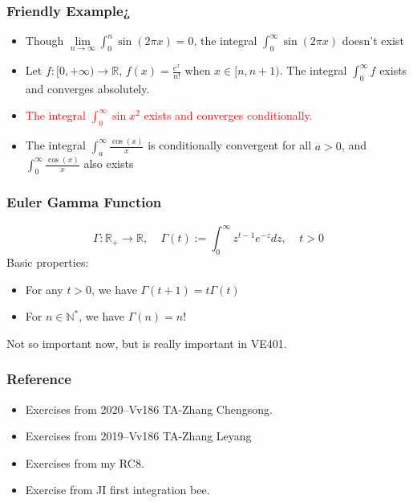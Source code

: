 \documentclass{beamer}
\newcommand{\R}{\mathbb{R}}
\newcommand{\vs}{\vspace{1em}}
\begin{document}
\begin{frame}
    \frametitle{Friendly Example¿}
    \begin{itemize}
        \item Though $\underset{n \to \infty}{\lim} \int_0^n \sin(2\pi x) =0$, the integral $\int_0^\infty \sin (2\pi x) $ doesn't exist 
        \item Let $f:[0, +\infty)\to \R$, $f(x)=\frac{e^x}{n!}$ when $x \in [n,n+1)$. The integral $\int_0^\infty f$ exists and converges absolutely. 
        \item \textcolor{red}{The integral $\int_0^\infty \sin x^2 $  exists and converges conditionally.} 
        \item The integral $\int_a^\infty \frac{\cos(x)}{x}$ is conditionally convergent for all $a>0$, and $\int_0^\infty  \frac{\cos(x)}{x}$ also exists 
        
    \end{itemize}
    

\end{frame}
\begin{frame}
    \frametitle{Euler Gamma Function}
     $$\Gamma : \R_+ \to \R, ~~~~~ \Gamma(t):=\int_0^\infty z^{t-1}e^{-z}dz,~~~~~ t>0$$
    Basic properties:
    \begin{itemize}
        \item For any $t>0$, we have $\Gamma(t+1)=t\Gamma(t)$
        \item For $n\in \mathbb{N}^*$, we have $\Gamma(n)=n!$
    \end{itemize}
    \vs
    Not so important now, but is really important in VE401.
\end{frame}
\begin{frame}
    \frametitle{Reference}
    \begin{itemize}
        \item Exercises from 2020--Vv186 TA-Zhang Chengsong.
        \item Exercises from 2019--Vv186 TA-Zhang Leyang
        \item Exercises from my RC8.
        \item Exercise from JI first integration bee.
    \end{itemize}
\end{frame}
\end{document}

